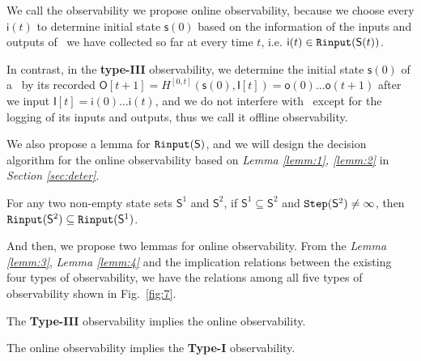 We call the observability we propose online observability, because we choose every $\mathsf{i}(t)$ to determine initial state $\mathsf{s}(0)$ based on the information of the inputs and outputs of \BCN\ we have collected so far at every time $t$, i.e. $\mathsf{i}(t)\in{\tt Rinput}(\mathsf{S}(t))$. 

In contrast, in the {\bf type-III} observability, we determine the initial state $\mathsf{s}(0)$ of a \BCN\ by its recorded $\mathsf{O}[t+1]= H^{[0,t]}(\mathsf{s}(0),\mathsf{I}[t])=\mathsf{o}(0)\ldots\mathsf{o}(t+1)$ after we input $\mathsf{I}[t]=\mathsf{i}(0)\ldots\mathsf{i}(t)$, and  we do not interfere with \BCN\ except for the logging of its inputs and outputs, thus we call it offline observability.

We also propose a lemma for ${\tt Rinput}(\mathsf{S})$, and we will design the decision algorithm for the online observability based on {\em Lemma \ref{lemm:1}, \ref{lemm:2}} in {\em Section \ref{sec:deter}}.
\begin{lemma}
For any two non-empty state sets  $\mathsf{S}^{1}$ and $\mathsf{S}^{2}$, if $\mathsf{S}^{1}\subseteq\mathsf{S}^{2}$ and ${\tt Step}(\mathsf{S}^{2})\ne\infty$, then ${\tt Rinput}(\mathsf{S}^2)\subseteq{\tt Rinput}(\mathsf{S}^1)$.
\label{lemm:2}
\end{lemma}





And then, we propose two lemmas for online observability. From the {\em Lemma \ref{lemm:3}}, {\em Lemma \ref{lemm:4}} and the implication relations between the existing four types of observability, we have the relations among all five types of observability shown in Fig.~\ref{fig:7}.

\begin{lemma}
The {\bf Type-III} observability implies the online observability.
\label{lemm:4}
\end{lemma}

\begin{lemma}
The online observability implies the  {\bf Type-I} observability.
\label{lemm:3}
\end{lemma}






